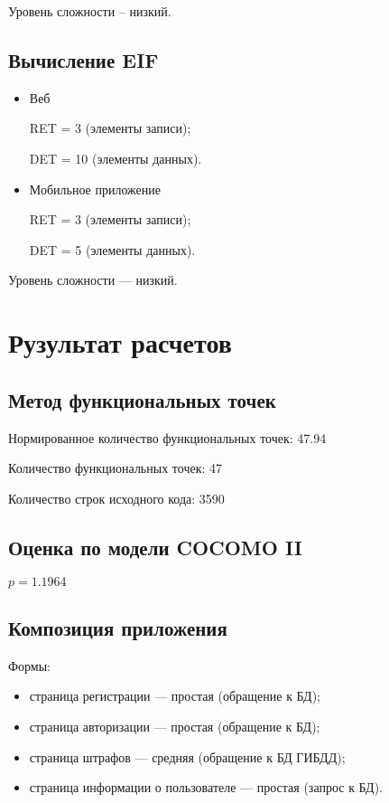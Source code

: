 Уровень сложности – низкий.

\subsection*{Вычисление EIF}

\begin{itemize}[label = ---]
    \item Веб
    
    RET = 3 (элементы записи);
    
    DET = 10 (элементы данных).
    
    \item Мобильное приложение
    
    RET = 3 (элементы записи);
    
    DET = 5 (элементы данных).
\end{itemize}

Уровень сложности --- низкий.

\section{Рузультат расчетов}

\subsection{Метод функциональных точек}

Нормированное количество функциональных точек: 47.94

Количество функциональных точек: 47

Количество строк исходного кода: 3590


\clearpage

\subsection{Оценка по модели COCOMO II}

$p = 1.1964$


\subsection{Композиция приложения}

Формы:
\begin{itemize}[label = ---]
    \item страница регистрации --- простая (обращение к БД);
    \item страница авторизации --- простая (обращение к БД);
    \item страница штрафов --- средняя (обращение к БД ГИБДД);
    \item страница информации о пользователе --- простая (запрос к БД).
\end{itemize}

